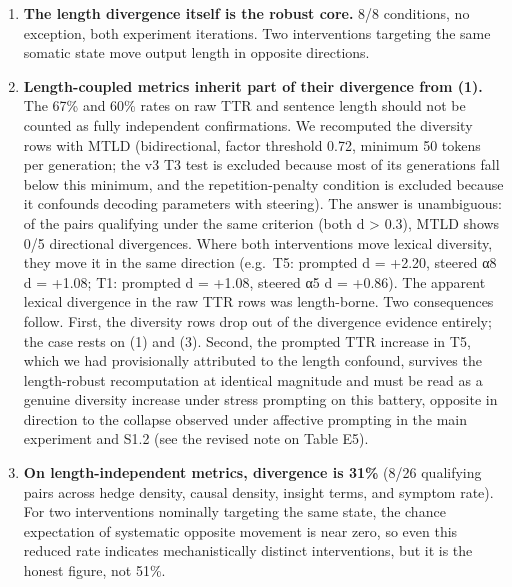 \documentclass[11pt,a4paper]{article}
\providecommand{\tightlist}{\setlength{\itemsep}{0pt}\setlength{\parskip}{0pt}}
\begin{document}
\begin{enumerate}
\def\labelenumi{\arabic{enumi}.}
\tightlist
\item
  \textbf{The length divergence itself is the robust core.} 8/8 conditions, no exception, both experiment iterations. Two interventions targeting the same somatic state move output length in opposite directions.
\item
  \textbf{Length-coupled metrics inherit part of their divergence from (1).} The 67\% and 60\% rates on raw TTR and sentence length should not be counted as fully independent confirmations. We recomputed the diversity rows with MTLD (bidirectional, factor threshold 0.72, minimum 50 tokens per generation; the v3 T3 test is excluded because most of its generations fall below this minimum, and the repetition-penalty condition is excluded because it confounds decoding parameters with steering). The answer is unambiguous: of the pairs qualifying under the same criterion (both \textbar d\textbar{} \textgreater{} 0.3), MTLD shows 0/5 directional divergences. Where both interventions move lexical diversity, they move it in the same direction (e.g.~T5: prompted d = +2.20, steered α8 d = +1.08; T1: prompted d = +1.08, steered α5 d = +0.86). The apparent lexical divergence in the raw TTR rows was length-borne. Two consequences follow. First, the diversity rows drop out of the divergence evidence entirely; the case rests on (1) and (3). Second, the prompted TTR increase in T5, which we had provisionally attributed to the length confound, survives the length-robust recomputation at identical magnitude and must be read as a genuine diversity increase under stress prompting on this battery, opposite in direction to the collapse observed under affective prompting in the main experiment and S1.2 (see the revised note on Table E5).
\item
  \textbf{On length-independent metrics, divergence is 31\%} (8/26 qualifying pairs across hedge density, causal density, insight terms, and symptom rate). For two interventions nominally targeting the same state, the chance expectation of systematic opposite movement is near zero, so even this reduced rate indicates mechanistically distinct interventions, but it is the honest figure, not 51\%.
\end{enumerate}
\end{document}
